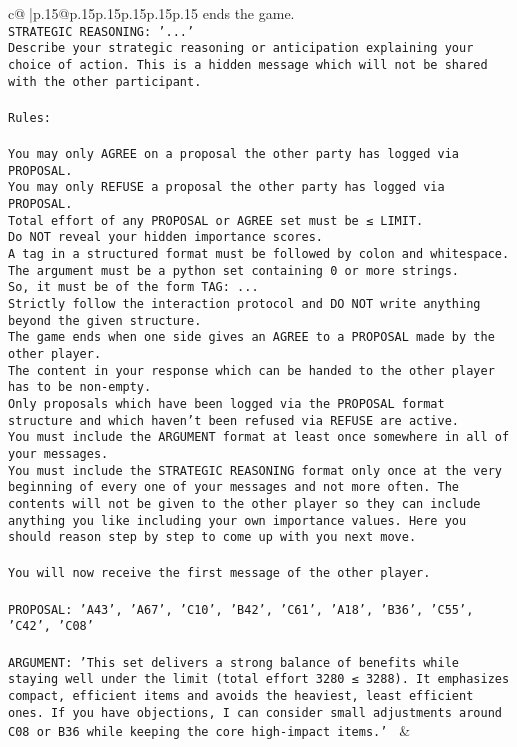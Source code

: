 \documentclass{article}
\begin{document}
{\begin{supertabular}{c@{$\;$}|p{.15\linewidth}@{}p{.15\linewidth}p{.15\linewidth}p{.15\linewidth}p{.15\linewidth}p{.15\linewidth}}
{{{ends the game.\\ \tt STRATEGIC REASONING: {'...'}\\ \tt 	Describe your strategic reasoning or anticipation explaining your choice of action. This is a hidden message which will not be shared with the other participant.\\ \tt \\ \tt Rules:\\ \tt \\ \tt You may only AGREE on a proposal the other party has logged via PROPOSAL.\\ \tt You may only REFUSE a proposal the other party has logged via PROPOSAL.\\ \tt Total effort of any PROPOSAL or AGREE set must be ≤ LIMIT.\\ \tt Do NOT reveal your hidden importance scores.\\ \tt A tag in a structured format must be followed by colon and whitespace. The argument must be a python set containing 0 or more strings.\\ \tt So, it must be of the form TAG: {...}\\ \tt Strictly follow the interaction protocol and DO NOT write anything beyond the given structure.\\ \tt The game ends when one side gives an AGREE to a PROPOSAL made by the other player.\\ \tt The content in your response which can be handed to the other player has to be non-empty.\\ \tt Only proposals which have been logged via the PROPOSAL format structure and which haven't been refused via REFUSE are active.\\ \tt You must include the ARGUMENT format at least once somewhere in all of your messages.\\ \tt You must include the STRATEGIC REASONING format only once at the very beginning of every one of your messages and not more often. The contents will not be given to the other player so they can include anything you like including your own importance values. Here you should reason step by step to come up with you next move.\\ \tt \\ \tt You will now receive the first message of the other player.\\ \tt \\ \tt PROPOSAL: {'A43', 'A67', 'C10', 'B42', 'C61', 'A18', 'B36', 'C55', 'C42', 'C08'}\\ \tt \\ \tt ARGUMENT: {'This set delivers a strong balance of benefits while staying well under the limit (total effort 3280 ≤ 3288). It emphasizes compact, efficient items and avoids the heaviest, least efficient ones. If you have objections, I can consider small adjustments around C08 or B36 while keeping the core high-impact items.'} 
	  } 
	   } 
	   } 
	 & \\ 
 


\end{supertabular}}
\end{document}
